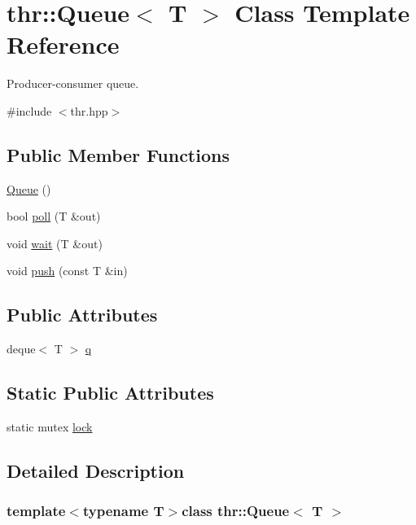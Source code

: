 \hypertarget{classthr_1_1_queue}{\section{thr\-:\-:Queue$<$ T $>$ Class Template Reference}
\label{classthr_1_1_queue}
}


Producer-\/consumer queue.  




{\ttfamily \#include $<$thr.\-hpp$>$}

\subsection*{Public Member Functions}
\begin{DoxyCompactItemize}
\item 
\hyperlink{classthr_1_1_queue_a5b21c17bdad3f7d88f7a30f92a2bd42d}{Queue} ()
\item 
bool \hyperlink{classthr_1_1_queue_a1ce03f6aee29d5dc8e4b3a247de063e5}{poll} (T \&out)
\item 
void \hyperlink{classthr_1_1_queue_ab095129fe0ba3dc63fa7300ffe2b11b9}{wait} (T \&out)
\item 
void \hyperlink{classthr_1_1_queue_a62768ce373068fa4b3baf574f5fed995}{push} (const T \&in)
\end{DoxyCompactItemize}
\subsection*{Public Attributes}
\begin{DoxyCompactItemize}
\item 
deque$<$ T $>$ \hyperlink{classthr_1_1_queue_aecde97de4091b83a35dcf2ec42cdcd7b}{q}
\end{DoxyCompactItemize}
\subsection*{Static Public Attributes}
\begin{DoxyCompactItemize}
\item 
static mutex \hyperlink{classthr_1_1_queue_abadc1f08bfec267edc24baaa442bb451}{lock}
\end{DoxyCompactItemize}


\subsection{Detailed Description}
\subsubsection*{template$<$typename T$>$class thr\-::\-Queue$<$ T $>$}

